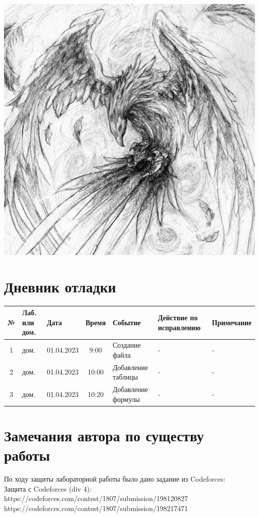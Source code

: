 \documentclass{article}
\begin{document}
\centering
\includegraphics[scale=0.25]{phoenix.jpg}

\raggedright


\section{Дневник отладки}

\begin{tabular}{|c|p{1cm}|p{1.5cm}|c|p{2.5cm}|p{2cm}|p{2.25cm}|}
    \hline
    № & Лаб. или дом. & Дата & Время & Событие & Действие по исправлению & Примечание\\
    \hline
    1 & дом. & 01.04.2023 & 9:00 & Создание файла & - & - \\ 
    \hline
    2 & дом. & 01.04.2023 & 10:00 & Добавление таблицы & - & - \\ 
    \hline
    3 & дом. & 01.04.2023 & 10:20 & Добавление формулы & - & - \\ 
    \hline
\end{tabular}


\section{Замечания автора по существу работы}
По ходу защиты лабораторной работы было дано задание из Codeforces: \\
Защита с Codeforces (div 4): \\
https://codeforces.com/contest/1807/submission/198120827 \\
https://codeforces.com/contest/1807/submission/198217471 \\
\end{document}

